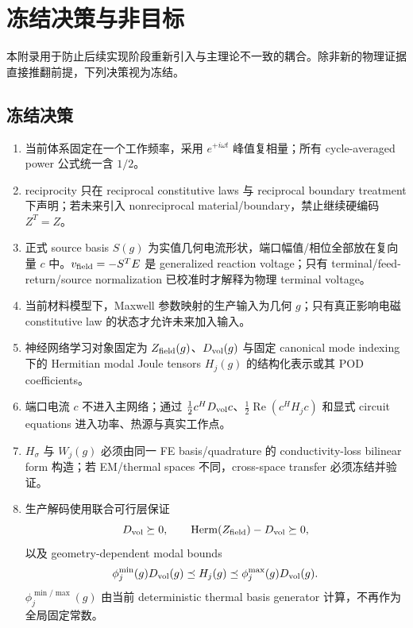 \section{冻结决策与非目标}

本附录用于防止后续实现阶段重新引入与主理论不一致的耦合。除非新的物理证据直接推翻前提，下列决策视为冻结。

\subsection{冻结决策}
\begin{enumerate}
  \item 当前体系固定在一个工作频率，采用 $e^{+i\omega t}$ 峰值复相量；所有 cycle-averaged power 公式统一含 $1/2$。
  \item reciprocity 只在 reciprocal constitutive laws 与 reciprocal boundary treatment 下声明；若未来引入 nonreciprocal material/boundary，禁止继续硬编码 $Z^T=Z$。
  \item 正式 source basis $S(g)$ 为实值几何电流形状，端口幅值/相位全部放在复向量 $c$ 中。$v_{\rm field}=-S^TE$ 是 generalized reaction voltage；只有 terminal/feed-return/source normalization 已校准时才解释为物理 terminal voltage。
  \item 当前材料模型下，Maxwell 参数映射的生产输入为几何 $g$；只有真正影响电磁 constitutive law 的状态才允许未来加入输入。
  \item 神经网络学习对象固定为 $Z_{\rm field}(g)$、$D_{\rm vol}(g)$ 与固定 canonical mode indexing 下的 Hermitian modal Joule tensors $H_j(g)$ 的结构化表示或其 POD coefficients。
  \item 端口电流 $c$ 不进入主网络；通过 $\frac12c^HD_{\rm vol}c$、$\frac12\operatorname{Re}(c^HH_jc)$ 和显式 circuit equations 进入功率、热源与真实工作点。
  \item $H_\sigma$ 与 $W_j(g)$ 必须由同一 FE basis/quadrature 的 conductivity-loss bilinear form 构造；若 EM/thermal spaces 不同，cross-space transfer 必须冻结并验证。
  \item 生产解码使用联合可行层保证
  \begin{equation}
  D_{\rm vol}\succeq0,
  \qquad
  \operatorname{Herm}(Z_{\rm field})-D_{\rm vol}\succeq0,
  \end{equation}
  以及 geometry-dependent modal bounds
  \begin{equation}
  \phi_j^{\min}(g)D_{\rm vol}(g)
  \preceq H_j(g)
  \preceq\phi_j^{\max}(g)D_{\rm vol}(g).
  \end{equation}
  $\phi_j^{\min/\max}(g)$ 由当前 deterministic thermal basis generator 计算，不再作为全局固定常数。

\end{enumerate}
